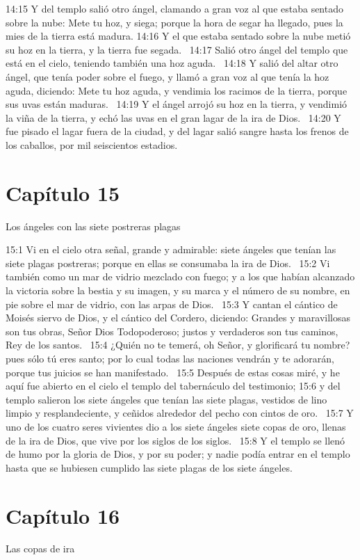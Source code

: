 14:15 Y del templo salió otro ángel, clamando a gran voz al que estaba sentado sobre la nube: Mete tu hoz, y siega; porque la hora de segar ha llegado, pues la mies de la tierra está madura. 
14:16 Y el que estaba sentado sobre la nube metió su hoz en la tierra, y la tierra fue segada.  
14:17 Salió otro ángel del templo que está en el cielo, teniendo también una hoz aguda.  
14:18 Y salió del altar otro ángel, que tenía poder sobre el fuego, y llamó a gran voz al que tenía la hoz aguda, diciendo: Mete tu hoz aguda, y vendimia los racimos de la tierra, porque sus uvas están maduras.  
14:19 Y el ángel arrojó su hoz en la tierra, y vendimió la viña de la tierra, y echó las uvas en el gran lagar de la ira de Dios.  
14:20 Y fue pisado el lagar fuera de la ciudad, y del lagar salió sangre hasta los frenos de los caballos, por mil seiscientos estadios. 
\section*{Capítulo 15 }
Los ángeles con las siete postreras plagas  

15:1 Vi en el cielo otra señal, grande y admirable: siete ángeles que tenían las siete plagas postreras; porque en ellas se consumaba la ira de Dios.  
15:2 Vi también como un mar de vidrio mezclado con fuego; y a los que habían alcanzado la victoria sobre la bestia y su imagen, y su marca y el número de su nombre, en pie sobre el mar de vidrio, con las arpas de Dios.  
15:3 Y cantan el cántico de Moisés siervo de Dios, y el cántico del Cordero, diciendo: Grandes y maravillosas son tus obras, Señor Dios Todopoderoso; justos y verdaderos son tus caminos, Rey de los santos.  
15:4 ¿Quién no te temerá, oh Señor, y glorificará tu nombre? pues sólo tú eres santo; por lo cual todas las naciones vendrán y te adorarán, porque tus juicios se han manifestado.  
15:5 Después de estas cosas miré, y he aquí fue abierto en el cielo el templo del tabernáculo del testimonio; 
15:6 y del templo salieron los siete ángeles que tenían las siete plagas, vestidos de lino limpio y resplandeciente, y ceñidos alrededor del pecho con cintos de oro.  
15:7 Y uno de los cuatro seres vivientes dio a los siete ángeles siete copas de oro, llenas de la ira de Dios, que vive por los siglos de los siglos.  
15:8 Y el templo se llenó de humo por la gloria de Dios, y por su poder; y nadie podía entrar en el templo hasta que se hubiesen cumplido las siete plagas de los siete ángeles.  
\section*{Capítulo 16}
Las copas de ira  

